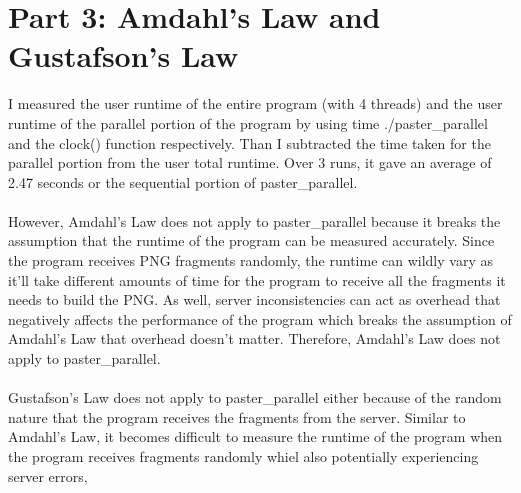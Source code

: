 \documentclass[12pt]{article}
\begin{document}
\section*{Part 3: Amdahl's Law and Gustafson's Law}
I measured the user runtime of the entire program (with 4 threads) and the user runtime of the parallel portion of the program by using time ./paster\_parallel and the clock() function respectively. Than I subtracted the time taken for the parallel portion from the user total runtime. Over 3 runs, it gave an average of 2.47 seconds or the sequential portion of paster\_parallel. \\
\\
However, Amdahl's Law does not apply to paster\_parallel because it breaks the assumption that the runtime of the program can be measured accurately. Since the program receives PNG fragments randomly, the runtime can wildly vary as it'll take different amounts of time for the program to receive all the fragments it needs to build the PNG. As well, server inconsistencies can act as overhead that negatively affects the performance of the program which breaks the assumption of Amdahl's Law that overhead doesn't matter. Therefore, Amdahl's Law does not apply to paster\_parallel. \\
\\
Gustafson's Law does not apply to paster\_parallel either because of the random nature that the program receives the fragments from the server. Similar to Amdahl's Law, it becomes difficult to measure the runtime of the program when the program receives fragments randomly whiel also potentially experiencing server errors, 
\end{document}
